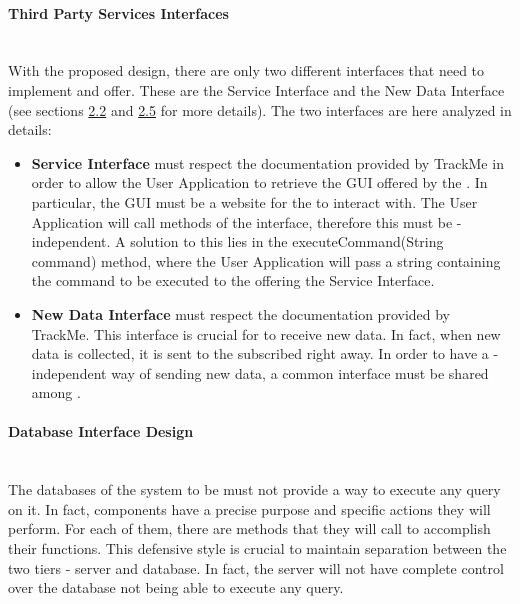 \documentclass[../../DD.tex]{subfiles}
\begin{document}
	\paragraph{Third Party Services Interfaces}\mbox{}\\
	With the proposed design, there are only two different interfaces that  need to implement and offer. These are the Service Interface and the New Data Interface (see sections \hyperref[sect:2.2]{2.2} and \hyperref[sect:2.5]{2.5} for more details).
	The two interfaces are here analyzed in details:
	\begin{itemize}
		\item \textbf{Service Interface} must respect the documentation provided by TrackMe in order to allow the User Application to retrieve the GUI offered by the . In particular, the GUI must be a website for the  to interact with. The User Application will call methods of the interface, therefore this must be -independent. A solution to this lies in the executeCommand(String command) method, where the User Application will pass a string containing the command to be executed to the  offering the Service Interface.
		\item \textbf{New Data Interface} must respect the documentation provided by TrackMe. This interface is crucial for  to receive new data. In fact, when new data is collected, it is sent to the subscribed  right away. In order to have a -independent way of sending new data, a common interface must be shared among .
	\end{itemize}

	\paragraph{Database Interface Design}\mbox{}\\
	The databases of the system to be must not provide a way to execute any query on it. In fact, components have a precise purpose and specific actions they will perform. For each of them, there are methods that they will call to accomplish their functions. This defensive style is crucial to maintain separation between the two tiers - server and database. In fact, the server will not have complete control over the database not being able to execute any query.
\end{document}
